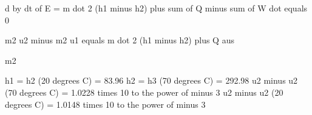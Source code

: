 d by dt of E = m dot 2 (h1 minus h2) plus sum of Q minus sum of W dot equals 0

m2 u2 minus m2 u1 equals m dot 2 (h1 minus h2) plus Q aus

m2

h1 = h2 (20 degrees C) = 83.96  
h2 = h3 (70 degrees C) = 292.98  
u2 minus u2 (70 degrees C) = 1.0228 times 10 to the power of minus 3  
u2 minus u2 (20 degrees C) = 1.0148 times 10 to the power of minus 3